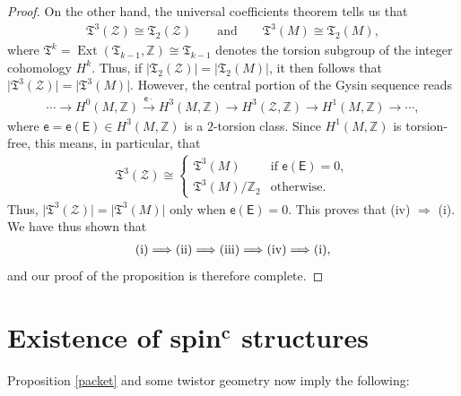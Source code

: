 \documentclass[pdftex]{sigma}
\numberwithin{equation}{section}
\def\ZZ{\mathbb{Z}}
\DeclareMathOperator{\Ext}{Ext}
\begin{document}
\begin{proof}
On the other hand, the universal coefficients theorem tells us that
\begin{gather}\label{judy}
\mathfrak{T}^3 (\mathcal{Z} ) \cong \mathfrak{T}_2 (\mathcal{Z} ) \qquad \mbox{and} \qquad \mathfrak{T}^3 (M) \cong \mathfrak{T}_2 (M),
\end{gather}
where $ \mathfrak{T}^k = \Ext ( \mathfrak{T}_{k-1} , \ZZ) \cong \mathfrak{T}_{k-1}$ denotes the torsion subgroup of the integer cohomology $H^k$.
Thus, if $|\mathfrak{T}_2 (\mathcal{Z} ) | = |\mathfrak{T}_2 (M)|$, it then follows that $\big|\mathfrak{T}^3 (\mathcal{Z} )\big| = \big|\mathfrak{T}^3 (M)\big|$.
However, the central portion of the Gysin sequence reads
\begin{gather*}
\cdots \to H^0 (M, \ZZ) \stackrel{\mathsf{e}\cdot}{\to} H^3 (M, \ZZ) \to H^3 (\mathcal{Z}, \ZZ ) \to H^1(M, \ZZ)\to \cdots,
\end{gather*}
where $ \mathsf{e}= \mathsf{e}(\mathsf{E})\in H^3 (M, \ZZ)$ is a $2$-torsion class. Since $H^1(M, \ZZ)$ is torsion-free,
this means, in particular, that
\begin{gather}\label{punch}
\mathfrak{T}^3 (\mathcal{Z} )\cong \begin{cases}
 \mathfrak{T}^3 (M ) & \text{if } \mathsf{e}(\mathsf{E})=0, \\
 \mathfrak{T}^3 (M )/\ZZ_2 & \text{otherwise}.
\end{cases}
\end{gather}
Thus, $\big|\mathfrak{T}^3 (\mathcal{Z} )\big| = \big|\mathfrak{T}^3 (M)\big|$ only when $\mathsf{e}(\mathsf{E})=0$.
This proves that (iv) $\Longrightarrow$ (i). We have thus shown that
\begin{gather*}
 {\rm (i)} \Longrightarrow {\rm (ii)} \Longrightarrow {\rm (iii)} \Longrightarrow {\rm (iv)} \Longrightarrow {\rm (i)},
\end{gather*}
and our proof of the proposition is therefore complete. \end{proof}

\section[Existence of spin c structures]{Existence of spin$\boldsymbol{{}^c}$ structures}\label{roundup}

Proposition \ref{packet} and some twistor geometry now imply the following:
\end{document}

